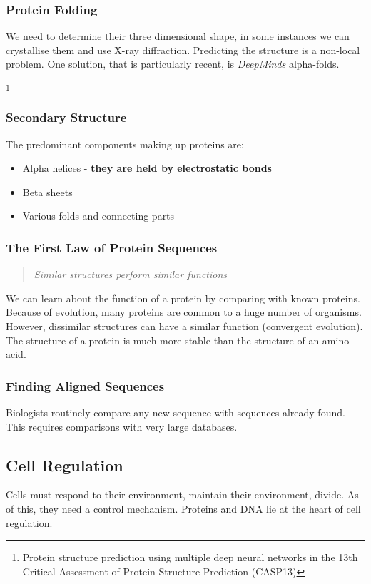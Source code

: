 \subsubsection{Protein Folding}
We need to determine their three dimensional shape, in some instances we can crystallise them and use X-ray diffraction. Predicting the structure is a non-local problem. One solution, that is particularly recent, is \textit{DeepMinds} alpha-folds.

\footnote{Protein structure prediction using multiple deep neural
networks in the 13th Critical Assessment of Protein
Structure Prediction (CASP13)}

\subsubsection{Secondary Structure}
The predominant components making up proteins are:
\begin{itemize}
    \itemsep0em
    \item Alpha helices - \textbf{they are held by electrostatic bonds}
    \item Beta sheets
    \item Various folds and connecting parts
\end{itemize}

\subsubsection{The First Law of Protein Sequences}

\begin{quote}
    \textit{Similar structures perform similar functions}
\end{quote}

We can learn about the function of a protein by comparing with known proteins. Because of evolution, many proteins are common to a huge number of organisms. However, dissimilar structures can have a similar function (convergent evolution). The structure of a protein is much more stable than the structure of an amino acid.

\subsubsection{Finding Aligned Sequences}
Biologists routinely compare any new sequence with sequences already found. This requires comparisons with very large databases.

\subsection{Cell Regulation}
Cells must respond to their environment, maintain their environment, divide. As of this, they need a control mechanism. Proteins and DNA lie at the heart of cell regulation.

